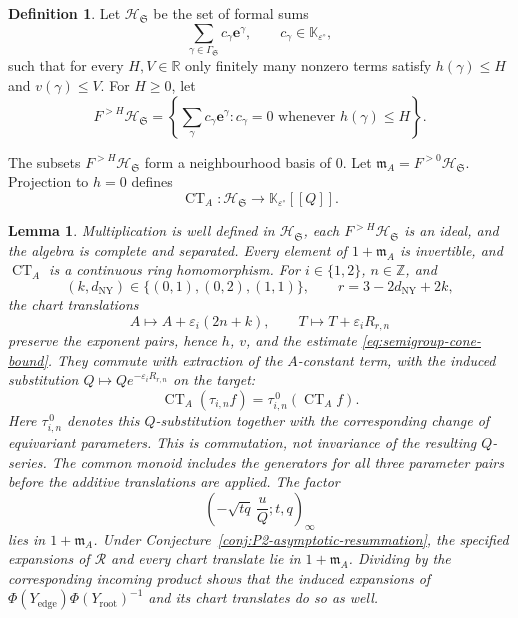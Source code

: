\documentclass{amsart}
\newtheorem{lemma}{Lemma}
\theoremstyle{definition}
\newtheorem{definition}{Definition}
\numberwithin{equation}{section}
\newcommand{\Z}{\mathbb Z}
\newcommand{\K}{\mathbb K}
\newcommand{\eps}{\varepsilon}
\begin{document}
\begin{definition}
\label{def:completed-semigroup-algebra}
Let \(\mathscr H_{\mathfrak S}\) be the set of formal sums
\begin{equation}
 \sum_{\gamma\in\Gamma_{\mathfrak S}}c_\gamma \mathbf e^\gamma,
 \qquad c_\gamma\in\K_{\eps^\circ},
\label{eq:completed-semigroup-algebra}
\end{equation}
such that for every \(H,V\in\mathbb R\) only finitely many nonzero terms satisfy \(h(\gamma)\leq H\) and \(v(\gamma)\leq V\).  For \(H\geq0\), let
\[
 F^{>H}\mathscr H_{\mathfrak S}
 =\left\{\sum_\gamma c_\gamma \mathbf e^\gamma:
 c_\gamma=0\text{ whenever }h(\gamma)\leq H\right\}.
\]
\end{definition}

The subsets \(F^{>H}\mathscr H_{\mathfrak S}\) form a neighbourhood basis of \(0\).  Let \(\mathfrak m_A=F^{>0}\mathscr H_{\mathfrak S}\).  Projection to \(h=0\) defines
\begin{equation}
 \operatorname{CT}_A:\mathscr H_{\mathfrak S}
 \longrightarrow\K_{\eps^\circ}[[Q]].
\label{eq:asymptotic-constant-term}
\end{equation}

\begin{lemma}
\label{lem:completed-semigroup-support}
Multiplication is well defined in \(\mathscr H_{\mathfrak S}\), each \(F^{>H}\mathscr H_{\mathfrak S}\) is an ideal, and the algebra is complete and separated.  Every element of \(1+\mathfrak m_A\) is invertible, and \(\operatorname{CT}_A\) is a continuous ring homomorphism.  For \(i\in\{1,2\}\), \(n\in\Z\), and
\[
 (k,d_{\mathrm{NY}})\in\{(0,1),(0,2),(1,1)\},
 \qquad r=3-2d_{\mathrm{NY}}+2k,
\]
the chart translations
\[
 A\longmapsto A+\eps_i(2n+k),\qquad
 T\longmapsto T+\eps_iR_{r,n}
\]
preserve the exponent pairs, hence \(h\), \(v\), and the estimate \eqref{eq:semigroup-cone-bound}.  They commute with extraction of the \(A\)-constant term, with the induced substitution \(Q\mapsto Qe^{-\eps_iR_{r,n}}\) on the target:
\[
 \operatorname{CT}_A(\tau_{i,n}f)
 =\tau_{i,n}^{\,0}(\operatorname{CT}_A f).
\]
Here \(\tau_{i,n}^{\,0}\) denotes this \(Q\)-substitution together with the corresponding change of equivariant parameters.  This is commutation, not invariance of the resulting \(Q\)-series.  The common monoid includes the generators for all three parameter pairs before the additive translations are applied.  The factor
\[
 \left(-\sqrt{tq}\,\frac uQ;t,q\right)_\infty
\]
lies in \(1+\mathfrak m_A\).  Under Conjecture~\ref{conj:P2-asymptotic-resummation}, the specified expansions of \(\mathcal R\) and every chart translate lie in \(1+\mathfrak m_A\).  Dividing by the corresponding incoming product shows that the induced expansions of \(\Phi(Y_{\mathrm{edge}})\Phi(Y_{\mathrm{root}})^{-1}\) and its chart translates do so as well.
\end{lemma}
\end{document}
